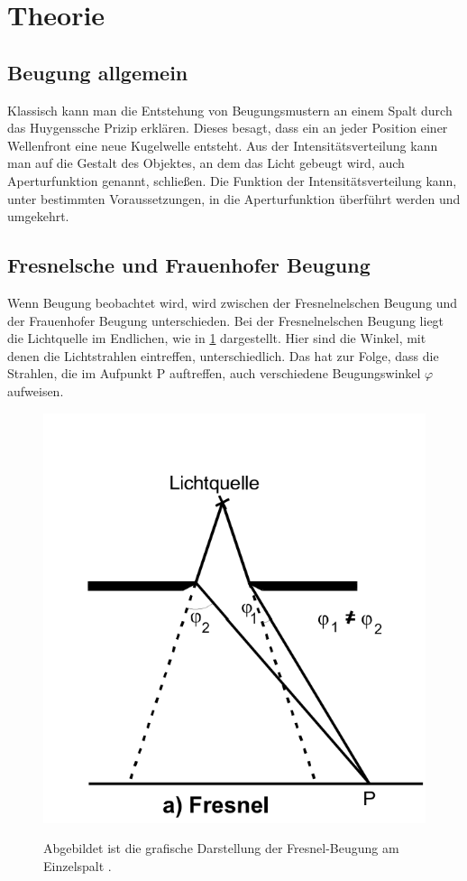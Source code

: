 \section{Theorie}
\label{sec:Theorie}
\subsection{Beugung allgemein}
Klassisch kann man die Entstehung von Beugungsmustern an einem Spalt durch das Huygenssche Prizip erklären.
Dieses besagt, dass ein an jeder Position einer Wellenfront eine neue Kugelwelle entsteht.
Aus der Intensitätsverteilung kann man auf die Gestalt des Objektes, an dem das Licht gebeugt wird, auch Aperturfunktion genannt, schließen.
Die Funktion der Intensitätsverteilung kann, unter bestimmten Voraussetzungen, in die Aperturfunktion überführt werden und umgekehrt.

\subsection{Fresnelsche und Frauenhofer Beugung}
Wenn Beugung beobachtet wird, wird zwischen der Fresnelnelschen Beugung und der Frauenhofer Beugung unterschieden.
Bei der Fresnelnelschen Beugung liegt die Lichtquelle im Endlichen, wie in \ref{fig:Fresnel} dargestellt.
Hier sind die Winkel, mit denen die Lichtstrahlen eintreffen, unterschiedlich. 
Das hat zur Folge, dass die Strahlen, die im Aufpunkt P auftreffen, auch verschiedene Beugungswinkel $\varphi$ aufweisen.

\begin{figure}[H]
    \centering
    \caption{Abgebildet ist die grafische Darstellung der Fresnel-Beugung am Einzelspalt \cite{V406}.}
    \includegraphics{Bilder/Fresnel.png}
    \label{fig:Fresnel}
\end{figure}

